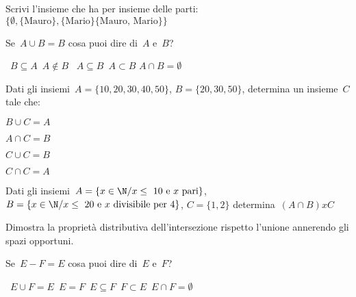 \begin{esercizio}
\label{ese:7.74}
Scrivi l'insieme che ha per insieme delle parti:
\(\{\emptyset,\{\text{Mauro}\},\{\text{Mario}\}\{\text{Mauro, Mario}\}\}\)
\end{esercizio}

\begin{esercizio}
\label{ese:7.75}
Se~\(A\cup B=B\) cosa puoi dire di~\(A\) e~\(B\)?
\begin{center}
 \boxA\quad~\(B\subseteq A\)\quad\boxB\quad~\(A\notin B\)\quad
 \boxC\quad~\(A\subseteq B\)\quad\boxD\quad~\(A\subset B\)\quad
 \boxE\quad\(A\cap B=\emptyset \)
\end{center}
\end{esercizio}

\begin{esercizio}
\label{ese:7.76}
Dati gli insiemi~\(A=\{10, 20, 30, 40, 50\}\), \(B=\{20, 30, 50\}\),
determina un insieme~\(C\) tale che:
\begin{multicols}{4}
\begin{enumeratea}
 \item \(B\cup C=A\)
 \item \(A\cap C=B\)
 \item \(C\cup C=B\)
 \item \(C\cap C=A\)
\end{enumeratea}
\end{multicols}
\end{esercizio}

\begin{esercizio}
\label{ese:7.77}
Dati gli insiemi~\(A=\{x\in\N/x\le~10\text{ e }x\text{ pari}\}\),
\(B=\{x\in\N/x\le~20\text{ e }x\text{ divisibile per }4\}\),
\(C=\{1,2\}\) determina~\((A\cap B)xC\)
\end{esercizio}

\begin{esercizio}
\label{ese:7.78}
Dimostra la proprietà distributiva dell'intersezione rispetto l'unione 
annerendo 
gli spazi opportuni.
\begin{center}
 
\end{center}
\vspace{-12pt}
\end{esercizio}


\begin{esercizio}
\label{ese:7.79}
Se~\(E-F=E\) cosa puoi dire di~\(E\) e~\(F\)?
\begin{center}
 \boxA\quad~\(E\cup F=E\)\quad\boxB\quad~\(E=F\)\quad\boxC\quad~\(E\subseteq 
F\)\quad\boxD\quad~\(F\subset E\)\quad\boxE\quad~\(E\cap F=\emptyset \)
\end{center}
\end{esercizio}

